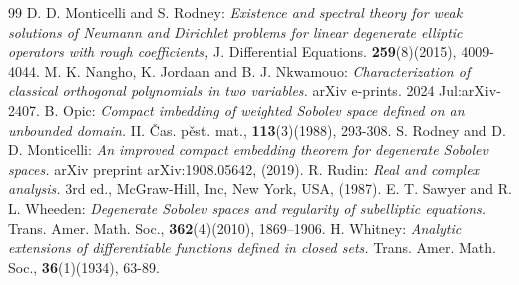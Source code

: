 \documentclass[11pt]{article}
\begin{document}
\begin{thebibliography}{99}
	 D. D. Monticelli  {\rm and} S. Rodney: \textit{Existence and spectral theory for weak solutions of Neumann and Dirichlet problems for linear degenerate elliptic operators with rough coefficients,} J. Differential Equations. {\bf 259}(8)(2015), 4009-4044.
	  M. K. Nangho,  K. Jordaan {\rm and} B. J.  Nkwamouo: \textit{Characterization of classical orthogonal polynomials in two variables.} arXiv e-prints. 2024 Jul:arXiv-2407.
	 B. Opic: \textit{Compact imbedding of weighted Sobolev space defined on an unbounded domain.} II. {Čas. pěst. mat.},  {\bf 113}(3)(1988), 293-308.
	 S. Rodney  {\rm and} D. D. Monticelli:\textit{ An improved compact embedding theorem for degenerate Sobolev spaces.} {arXiv preprint arXiv:1908.05642}, (2019).
	 R. Rudin: \textit{Real and complex analysis.} 3rd ed., McGraw-Hill, Inc, New York, USA, (1987).
	  E. T. Sawyer  {\rm and}  R. L. Wheeden: \textit{Degenerate Sobolev spaces and regularity of subelliptic equations.} {Trans. Amer. Math. Soc.,}  {\bf 362}(4)(2010), 1869–1906.
	 H. Whitney: \textit{Analytic extensions of differentiable functions defined in closed sets.} {Trans. Amer. Math. Soc.,} {\bf 36}(1)(1934), 63-89.
	\end{thebibliography}
\end{document}
